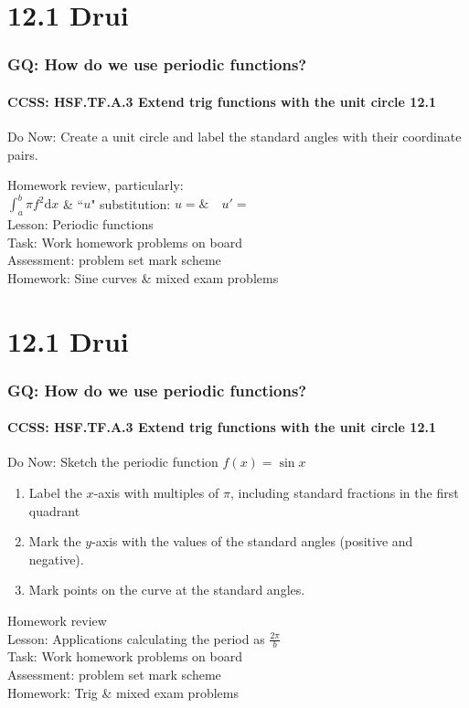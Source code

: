 \documentclass{beamer}
\begin{document}
  \section{12.1 Drui}
  \frame
  {
    \frametitle{GQ: How do we use periodic functions?}
    \framesubtitle{CCSS: HSF.TF.A.3 Extend trig functions with the unit circle \qquad \alert{12.1}}

    \begin{block}{Do Now: Create a unit circle and label the standard angles with their coordinate pairs.}
   \end{block}
    Homework review, particularly: \\ $\displaystyle \int_a^b \pi f^2 \text{d}x$ \&
  ``$u$" substitution: $u= \& \quad u'=$\\[5pt]
    Lesson: Periodic functions\\%
    Task: Work homework problems on board\\%
    Assessment: problem set mark scheme\\%
    Homework: Sine curves \& mixed exam problems
  }


  \section{12.1 Drui}
  \frame
  {
    \frametitle{GQ: How do we use periodic functions?}
    \framesubtitle{CCSS: HSF.TF.A.3 Extend trig functions with the unit circle \qquad \alert{12.1}}

    \begin{block}{Do Now: Sketch the periodic function $f(x)=\sin{x}$}
      \begin{enumerate}
      \item Label the $x$-axis with multiples of $\pi$, including standard fractions in the first quadrant
      \item Mark the $y$-axis with the values of the standard angles (positive and negative).
      \item Mark points on the curve at the standard angles.
      \end{enumerate}
   \end{block}
    Homework review\\[5pt]
    Lesson: Applications calculating the period as $\frac{2\pi}{b}$\\%
    Task: Work homework problems on board\\%
    Assessment: problem set mark scheme\\%
    Homework: Trig \& mixed exam problems
  }
\end{document}
